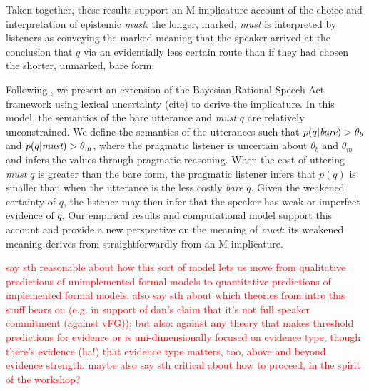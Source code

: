 \documentclass[11pt]{article}
\newcommand{\red}[1]{\textcolor{Red}{#1}}
\begin{document}
Taken together, these results support an M-implicature account of the choice and interpretation of epistemic \emph{must}: the longer, marked, \emph{must} is interpreted by listeners as conveying the marked meaning that the speaker arrived at the conclusion that $q$ via an evidentially less certain route than if they had chosen the shorter, unmarked, bare form. %

Following , we present an extension of the Bayesian Rational Speech Act framework  using lexical uncertainty (cite) to derive the implicature. In this model,  the semantics of the bare utterance and \emph{must} $q$ are relatively unconstrained. We define the semantics of the utterances such that $p(q | \emph{bare} ) > \theta_b$ and $p(q | \emph{must} ) > \theta_m$, where the pragmatic listener is uncertain about $\theta_b$ and $\theta_m$ and infers the values through pragmatic reasoning. When the cost of uttering \emph{must} $q$ is greater than the bare form, the pragmatic listener infers that $p(q)$ is smaller than when the utterance is the less costly \emph{bare} $q$. 
Given the weakened certainty of $q$, the listener may then infer that the speaker has weak or imperfect evidence of $q$. Our empirical results and computational model  support this account and provide a new perspective on the meaning of \emph{must}: its weakened meaning derives from straightforwardly from an M-implicature.

\red{say sth reasonable about how this sort of model lets us move from qualitative predictions of unimplemented formal models to quantitative predictions of implemented formal models. also say sth about which theories from intro this stuff bears on (e.g. in support of dan's claim that it's not full speaker commitment (against vFG)); but also: against any theory that makes threshold predictions for evidence or is uni-dimensionally focused on evidence type, though there's evidence (ha!) that evidence type matters, too, above and beyond evidence strength. maybe also say sth critical about how to proceed, in the spirit of the workshop?}



\end{document}
